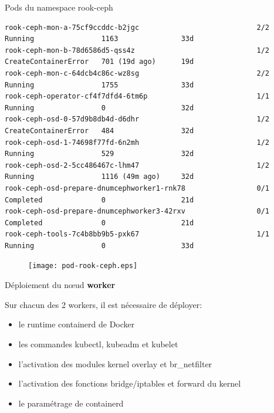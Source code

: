 \begin{frame}[fragile,shrink=0.9]{Pods du namespace rook-ceph}
\begin{tiny}
\begin{Verbatim}[commandchars=\\\{\}]
rook-ceph-mon-a-75cf9ccddc-b2jgc                            2/2     Running                1163               33d
rook-ceph-mon-b-78d6586d5-qss4z                             1/2     CreateContainerError   701 (19d ago)      19d
rook-ceph-mon-c-64dcb4c86c-wz8sg                            2/2     Running                1755               33d
rook-ceph-operator-cf4f7dfd4-6tm6p                          1/1     Running                0                  32d
rook-ceph-osd-0-57d9b8db4d-d6dhr                            1/2     CreateContainerError   484                32d
rook-ceph-osd-1-74698f77fd-6n2mh                            1/2     Running                529                32d
rook-ceph-osd-2-5cc486467c-lhm47                            1/2     Running                1116 (49m ago)     32d
rook-ceph-osd-prepare-dnumcephworker1-rnk78                 0/1     Completed              0                  21d
rook-ceph-osd-prepare-dnumcephworker3-42rxv                 0/1     Completed              0                  21d
rook-ceph-tools-7c4b8bb9b5-pxk67                            1/1     Running                0                  33d
\end{Verbatim}
\end{tiny}

\begin{figure}
\begin{center}
\texttt{[image: pod-rook-ceph.eps]}
\end{center}
\end{figure}

\end{frame}


\begin{frame}[fragile]{Déploiement du n{\oe}ud \textbf{worker}}

   Sur chacun des 2 workers, il est nécessaire de déployer:
   \begin{itemize}
      \item le runtime containerd de Docker
      \item les commandes kubectl, kubeadm et kubelet
      \item l'activation des modules kernel overlay et br\_netfilter
      \item l'activation des fonctions bridge/iptables et forward du kernel
      \item le paramétrage de containerd
   \end{itemize}

\end{frame}

